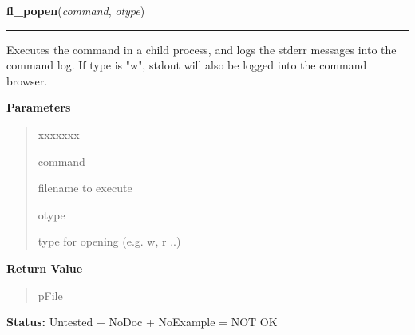 \hspace{.8\funcindent}\begin{boxedminipage}{\funcwidth}

    \raggedright \textbf{fl\_popen}(\textit{command}, \textit{otype})

    \vspace{-1.5ex}

    \rule{\textwidth}{0.5\fboxrule}
\setlength{\parskip}{2ex}
    Executes the command in a child process, and logs the stderr messages 
    into the command log. If type is "w", stdout will also be logged into 
    the command browser.

\setlength{\parskip}{1ex}
      \textbf{Parameters}
      \vspace{-1ex}

      \begin{quote}
        \begin{Ventry}{xxxxxxx}

          \item[command]

          filename to execute

          \item[otype]

          type for opening (e.g. w, r ..)

        \end{Ventry}

      \end{quote}

      \textbf{Return Value}
    \vspace{-1ex}

      \begin{quote}
      pFile

      \end{quote}

\textbf{Status:} Untested + NoDoc + NoExample = NOT OK



    \end{boxedminipage}

    \label{xformslib:library:fl_pclose}

    \vspace{0.5ex}

